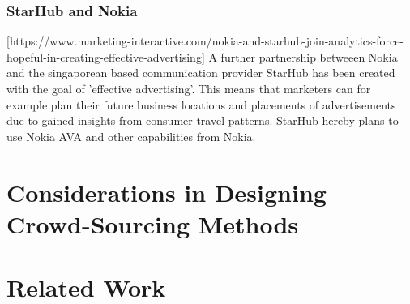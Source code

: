 \documentclass[a4paper,12pt]{report}
\begin{document}
	\subsection{StarHub and Nokia}
	[https://www.marketing-interactive.com/nokia-and-starhub-join-analytics-force-hopeful-in-creating-effective-advertising]
	A further partnership betweeen Nokia and the singaporean  based communication provider StarHub has been created with the goal of 'effective advertising'. This means that marketers can for example plan their future business locations and placements of advertisements due to gained insights from consumer travel patterns. StarHub hereby plans to use Nokia AVA and other capabilities from Nokia. 
	
	\closesection

	\chapter{Considerations in Designing Crowd-Sourcing Methods}
	\startsection
	\closesection
	
	\chapter{Related Work \cite{LanierWeylBlueprint}}
	\startsection
	\closesection


	\newpage
	\printbibliography
\end{document}
